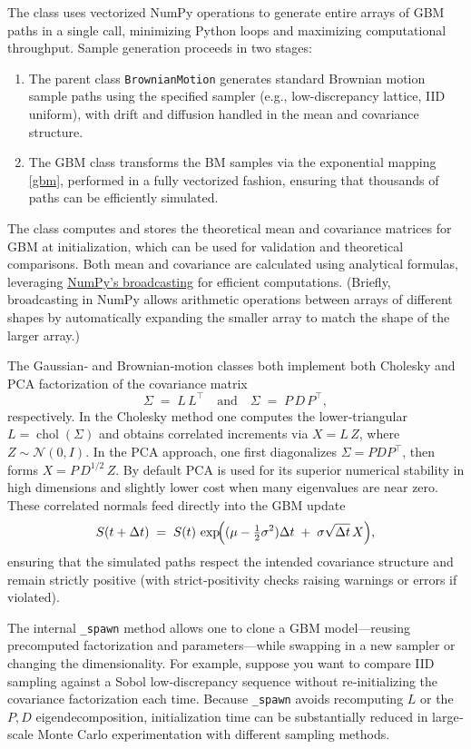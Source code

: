 \documentclass{article}
\begin{document}
The class uses vectorized NumPy operations to generate entire arrays of GBM paths in a single call, minimizing Python loops and maximizing computational throughput. Sample generation proceeds in two stages:
\begin{enumerate}
\item 
The parent class \texttt{BrownianMotion} generates standard Brownian motion sample paths using the specified sampler (e.g., low-discrepancy lattice, IID uniform), with drift and diffusion handled in the mean and covariance structure.
\item  The GBM class transforms the BM samples via the exponential mapping    \eqref{gbm}, performed in a fully vectorized fashion, ensuring that thousands of paths can be efficiently simulated.
\end{enumerate}
The class computes and stores the theoretical mean and covariance matrices for GBM at initialization, which can be used for validation and theoretical comparisons. Both mean and covariance are calculated using analytical formulas, leveraging \href{https://numpy.org/devdocs/user/basics.broadcasting.html}{NumPy’s broadcasting} for efficient computations. (Briefly, broadcasting in NumPy allows arithmetic operations between arrays of different shapes by automatically expanding the smaller array to match the shape of the larger array.)

 The Gaussian‐ and Brownian‐motion classes both implement both Cholesky and PCA factorization of the covariance matrix
\[
\Sigma \;=\; L\,L^{\!\top}
\quad\text{and}\quad
\Sigma \;=\; P\,D\,P^{\!\top},
\]
respectively.  In the Cholesky method one computes the lower‐triangular $L=\operatorname{chol}(\Sigma)$ and obtains correlated increments via $X=L\,Z$, where $Z\sim\mathcal{N}(0,I)$.  In the PCA approach, one first diagonalizes $\Sigma=PDP^{\!\top}$, then forms $X = P\,D^{1/2}\,Z$.  By default PCA is used for its superior numerical stability in high dimensions and slightly lower cost when many eigenvalues are near zero.  These correlated normals feed directly into the GBM update
\[
S(t+\Delta t) \;=\; S(t)\,\exp\!\Bigl((\mu - \tfrac12\sigma^2)\Delta t \;+\;\sigma\sqrt{\Delta t}\,X\Bigr),
\]
ensuring that the simulated paths respect the intended covariance structure and remain strictly positive (with strict‐positivity checks raising warnings or errors if violated).


The internal \texttt{\_spawn} method allows one to clone a GBM model—reusing precomputed factorization and parameters—while swapping in a new sampler or changing the dimensionality.  For example, suppose you want to compare IID sampling against a Sobol low‐discrepancy sequence without re‐initializing the covariance factorization each time. 
Because \texttt{\_spawn} avoids recomputing $L$ or the $P,D$ eigendecomposition, initialization time can be substantially reduced in large‐scale Monte Carlo experimentation with different sampling methods.
\end{document}
